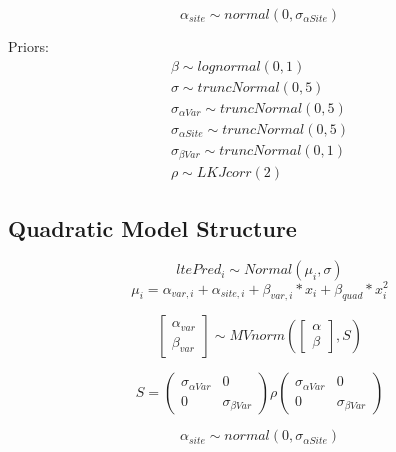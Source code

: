 \documentclass[11pt,letter]{article}
\begin{document}
\begin{equation*}
\alpha_{site} \sim normal(0, \sigma_{\alpha Site}) 
\end{equation*}

Priors:
\begin{gather*}
\beta \sim lognormal(0,1)\\
\sigma \sim truncNormal(0,5)\\
\sigma_{\alpha Var} \sim truncNormal(0,5)\\
\sigma_{\alpha Site} \sim truncNormal(0,5)\\
\sigma_{\beta Var} \sim truncNormal(0,1)\\
\rho \sim LKJcorr (2)
\end{gather*}


\subsection{Quadratic Model Structure}

\begin{equation*}
ltePred_{i} \sim Normal(\mu_{i}, \sigma ) 
\end{equation*}
\begin{equation*}
\mu_{i} = \alpha_{var,i} + \alpha_{site, i}+ \beta_{var, i}\ast x_{i} + \beta_{quad} \ast x^{2}_{i}
\end{equation*}

\begin{equation*}
\begin{bmatrix}
\alpha_{var} \\
\beta_{var}
\end{bmatrix}
\sim MVnorm
\left(
\begin{bmatrix}
\alpha \\
\beta
\end{bmatrix}
,S
\right)
\end{equation*}

\begin{equation*}
S = 
\begin{pmatrix}
\sigma_{\alpha Var} & 0 \\
0 & \sigma_{\beta Var} 
\end{pmatrix}
\rho
\begin{pmatrix}
\sigma_{\alpha Var} & 0 \\
0 & \sigma_{\beta Var} 
\end{pmatrix}
\end{equation*}

\begin{equation*}
\alpha_{site} \sim normal(0, \sigma_{\alpha Site}) 
\end{equation*}
\end{document}
